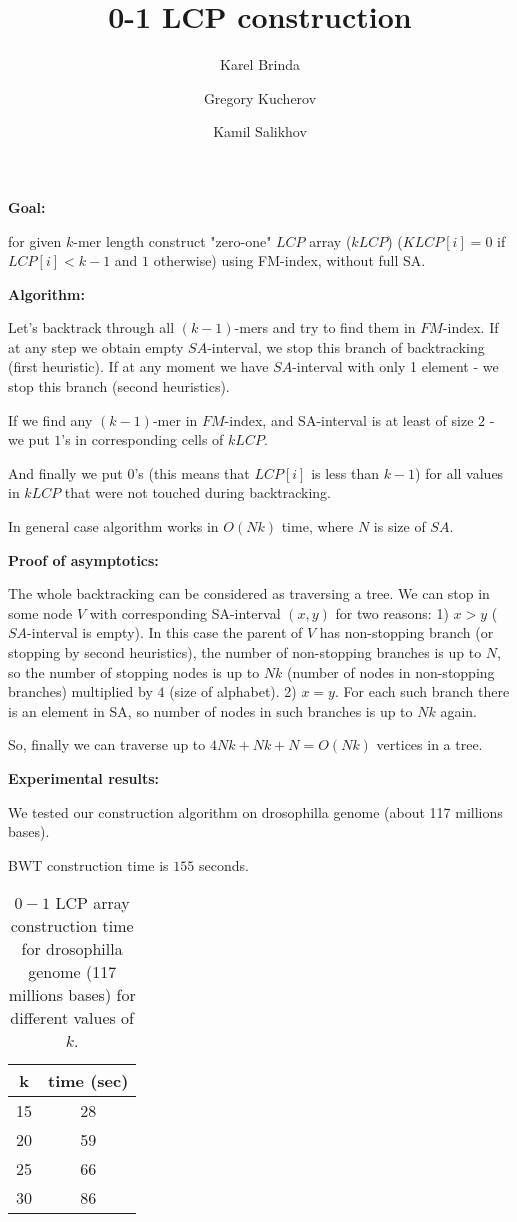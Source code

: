 \documentclass[12pt]{article}
\begin{document}
\thispagestyle{empty}

\title{0-1 LCP construction}
\author{Karel Brinda \and Gregory Kucherov \and Kamil Salikhov}
\maketitle

{\bf Goal:} 

for given $k$-mer length construct "zero-one" $LCP$ array ($kLCP$) ($KLCP[i] = 0$ if $LCP[i] < k-1$ and $1$ otherwise) using FM-index, without full SA.

{\bf Algorithm:}

Let's backtrack through all $(k-1)$-mers and try to find them in $FM$-index. If at any step we obtain empty $SA$-interval, we stop this branch of backtracking (first heuristic).
If at any moment we have $SA$-interval with only 1 element - we stop this branch (second heuristics).

If we find any $(k-1)$-mer in $FM$-index, and SA-interval is at least of size $2$ - we put $1$'s in corresponding cells of $kLCP$.

And finally we put $0$'s (this means that $LCP[i]$ is less than $k-1$) for all values in $kLCP$ that were not touched during backtracking.

In general case algorithm works in $O(Nk)$ time, where $N$ is size of $SA$.

{\bf Proof of asymptotics:} 

The whole backtracking can be considered as traversing a tree. We can stop in some node $V$ with corresponding SA-interval $(x, y)$ for two reasons: 
1) $x > y$ ($SA$-interval is empty). In this case the parent of $V$ has non-stopping branch (or stopping by second heuristics), the number of non-stopping branches is up to $N$, so the number of stopping nodes is up to $Nk$ (number of nodes in non-stopping branches) multiplied by $4$ (size of alphabet).
2) $x = y$. For each such branch there is an element in SA, so number of nodes in such branches is up to $Nk$ again. 

So, finally we can traverse up to $4Nk + Nk + N = O(Nk)$ vertices in a tree. 

{\bf Experimental results:}

We tested our construction algorithm on drosophilla genome (about 117 millions bases).

BWT construction time is $155$ seconds.

\begin{table}[!tb]
\caption{
$0-1$ LCP array construction time for drosophilla genome (117 millions bases) for different values of $k$.
\label{tab:constr_time}}
\centering
\begin{tabular}{| c | c | }
  \hline
  k & time (sec) \\ 
  \hline
  15 & 28 \\
  \hline
  20 & 59 \\
  \hline
  25 & 66 \\
  \hline
  30 & 86 \\
  \hline
\end{tabular}
\end{table}
\end{document}
